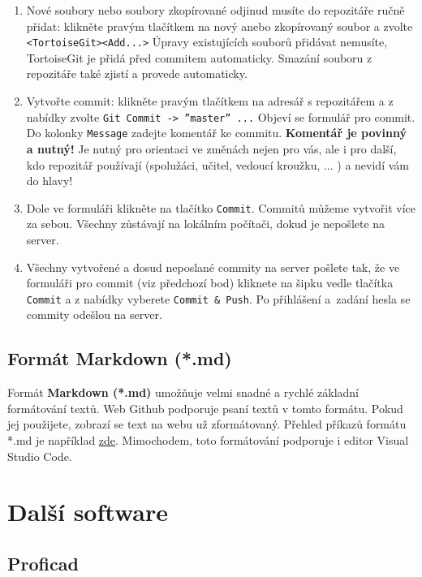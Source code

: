 \begin{enumerate}
	\item Nové soubory nebo soubory zkopírované odjinud musíte do repozitáře ručně přidat: 
	klikněte pravým tlačítkem na nový anebo zkopírovaný soubor a zvolte {\tt <TortoiseGit><Add...>} 
	Úpravy existujících souborů přidávat nemusíte, TortoiseGit je přidá před commitem automaticky. 
	Smazání souboru z repozitáře také zjistí a provede automaticky.
	
	\item Vytvořte commit: klikněte pravým tlačítkem na adresář s repozitářem a z nabídky zvolte {\tt Git Commit -> ''master'' ...}
	Objeví se formulář pro commit. Do kolonky {\tt Message} zadejte komentář ke commitu. 
	{\bf Komentář je povinný a nutný!} 
	Je nutný pro orientaci ve změnách nejen pro vás, ale i pro další, kdo repozitář používají (spolužáci, učitel, vedoucí kroužku, ... )  a nevidí vám do hlavy!
	
	\item Dole ve formuláři klikněte na tlačítko {\tt Commit}. Commitů můžeme vytvořit více za sebou. Všechny zůstávají na lokálním počítači, dokud je nepošlete na server.
	
	\item Všechny vytvořené a dosud neposlané commity na server pošlete tak, že ve formuláři pro commit (viz předchozí bod) kliknete 
	na šipku vedle tlačítka {\tt Commit} a z nabídky vyberete {\tt Commit \& Push}. Po přihlášení a~zadání hesla se commity odešlou na server.	
\end{enumerate}

 
 \subsection{Formát Markdown (*.md) }   
 
Formát \textbf{Markdown (*.md) } umožňuje velmi snadné a rychlé základní formátování textů. 
Web Github podporuje psaní textů v tomto formátu. 
Pokud jej použijete, zobrazí se text na webu už zformátovaný. 
Přehled příkazů formátu *.md je například \href{https://guides.github.com/pdfs/markdown-cheatsheet-online.pdf}{zde}.
 Mimochodem, toto formátování podporuje i editor Visual Studio Code.
 
\section{Další software}


\subsection{Proficad}


